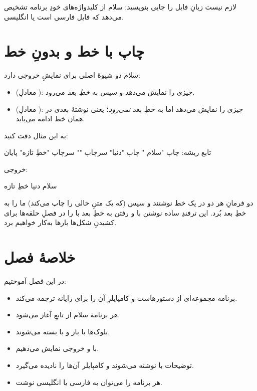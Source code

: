 \begin{note}
لازم نیست زبانِ فایل را جایی بنویسید: سلام از کلیدواژه‌های خودِ برنامه تشخیص
می‌دهد که فایل فارسی است یا انگلیسی.
\end{note}

\section{چاپ با خط و بدونِ خط}

سلام دو شیوهٔ اصلی برای نمایشِ خروجی دارد:

\begin{itemize}
  \item {} (معادلِ ): چیزی را نمایش می‌دهد و سپس به
        \emph{خطِ بعد} می‌رود.
  \item {} (معادلِ ): چیزی را نمایش می‌دهد اما به خطِ
        بعد \emph{نمی‌رود}؛ یعنی نوشتهٔ بعدی در همان خط ادامه می‌یابد.
\end{itemize}

به این مثال دقت کنید:

\begin{salamfa}
تابع ریشه:
    چاپ "سلام "
    چاپ "دنیا"
    سرچاپ ""
    سرچاپ "خطِ تازه"
پایان
\end{salamfa}

خروجی:

\begin{salamen}[language={}]
سلام دنیا
خطِ تازه
\end{salamen}

دو فرمانِ  هر دو در یک خط نوشتند و سپس  (که یک متنِ
خالی را چاپ می‌کند) ما را به خطِ بعد بُرد. این ترفندِ ساده نوشتن با
 و رفتن به خطِ بعد با  را در فصلِ حلقه‌ها برای
کشیدنِ شکل‌ها بارها به‌کار خواهیم برد.

\section{خلاصهٔ فصل}

در این فصل آموختیم:
\begin{itemize}
  \item برنامه مجموعه‌ای از دستورهاست و کامپایلرِ  آن را برای
        رایانه ترجمه می‌کند.
  \item هر برنامهٔ سلام از تابعِ  آغاز می‌شود.
  \item بلوک‌ها با \code{:} باز و با  بسته می‌شوند.
  \item با  و  خروجی نمایش می‌دهیم.
  \item توضیحات با \code{//} نوشته می‌شوند و کامپایلر آن‌ها را نادیده می‌گیرد.
  \item هر برنامه را می‌توان به فارسی یا انگلیسی نوشت.
\end{itemize}

